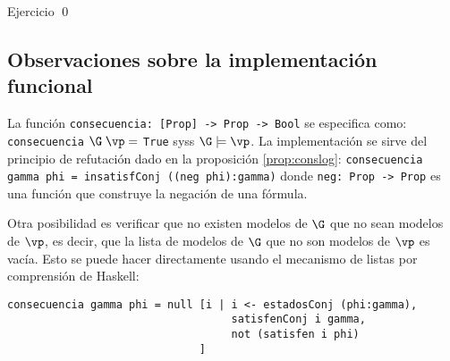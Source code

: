 \documentclass[11pt,letterpaper]{article}
\begin{document}
\proof
Ejercicio
\qed


\subsection{Observaciones sobre la implementaci\'on funcional}

\noindent La funci\'on \verb~consecuencia: [Prop] -> Prop -> Bool~ se 
especifica como:
\bc
\verb~consecuencia~ $\G\;\vp =$ \verb~True~ syss $\G\models\vp$.
\ec
La implementaci\'on se sirve del principio de refutaci\'on dado en la 
proposici\'on \ref{prop:conslog}:
\bc
\verb~consecuencia gamma phi = insatisfConj ((neg phi):gamma)~
\ec
donde \verb~neg: Prop -> Prop~ es una funci\'on que construye la negaci\'on 
de una f\'ormula.


Otra posibilidad es verificar que no existen modelos de $\G$ que no sean 
modelos de $\vp$, es decir, que la lista de modelos de $\G$ que no son modelos 
de $\vp$ es vac\'ia. Esto se puede hacer directamente usando 
el mecanismo de listas por comprensi\'on de {\sc Haskell}:

\begin{verbatim}
consecuencia gamma phi = null [i | i <- estadosConj (phi:gamma),
                                   satisfenConj i gamma,
                                   not (satisfen i phi)
                              ]
\end{verbatim}
\end{document}
